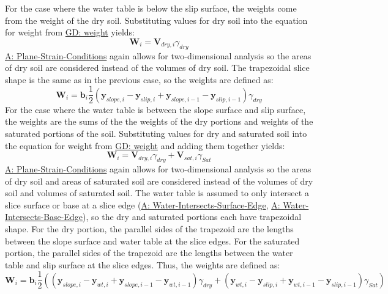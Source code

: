 \documentclass[12pt]{article}
\begin{document}
For the case where the water table is below the slip surface, the weights come from the weight of the dry soil. Substituting values for dry soil into the equation for weight from \hyperref[GD:weight]{GD: weight} yields:
\begin{displaymath}
{\mathbf{W}}_{i}={\mathbf{V}_{dry,i}} {γ_{dry}}
\end{displaymath}
\hyperref[assumpPSC]{A: Plane-Strain-Conditions} again allows for two-dimensional analysis so the areas of dry soil are considered instead of the volumes of dry soil. The trapezoidal slice shape is the same as in the previous case, so the weights are defined as:
\begin{displaymath}
{\mathbf{W}}_{i}={\mathbf{b}}_{i} \frac{1}{2} \left({\mathbf{y}_{slope,i}}-{\mathbf{y}_{slip,i}}+{\mathbf{y}_{slope,i-1}}-{\mathbf{y}_{slip,i-1}}\right) {γ_{dry}}
\end{displaymath}
For the case where the water table is between the slope surface and slip surface, the weights are the sums of the the weights of the dry portions and weights of the saturated portions of the soil. Substituting values for dry and saturated soil into the equation for weight from \hyperref[GD:weight]{GD: weight} and adding them together yields:
\begin{displaymath}
{\mathbf{W}}_{i}={\mathbf{V}_{dry,i}} {γ_{dry}}+{\mathbf{V}_{sat,i}} {γ_{Sat}}
\end{displaymath}
\hyperref[assumpPSC]{A: Plane-Strain-Conditions} again allows for two-dimensional analysis so the areas of dry soil and areas of saturated soil are considered instead of the volumes of dry soil and volumes of saturated soil. The water table is assumed to only intersect a slice surface or base at a slice edge (\hyperref[assumpWISE]{A: Water-Intersects-Surface-Edge}, \hyperref[assumpWIBE]{A: Water-Intersects-Base-Edge}), so the dry and saturated portions each have trapezoidal shape. For the dry portion, the parallel sides of the trapezoid are the lengths between the slope surface and water table at the slice edges. For the saturated portion, the parallel sides of the trapezoid are the lengths between the water table and slip surface at the slice edges. Thus, the weights are defined as:
\begin{displaymath}
{\mathbf{W}}_{i}={\mathbf{b}}_{i} \frac{1}{2} \left(\left({\mathbf{y}_{slope,i}}-{\mathbf{y}_{wt,i}}+{\mathbf{y}_{slope,i-1}}-{\mathbf{y}_{wt,i-1}}\right) {γ_{dry}}+\left({\mathbf{y}_{wt,i}}-{\mathbf{y}_{slip,i}}+{\mathbf{y}_{wt,i-1}}-{\mathbf{y}_{slip,i-1}}\right) {γ_{Sat}}\right)
\end{displaymath}
\par~
\end{document}
